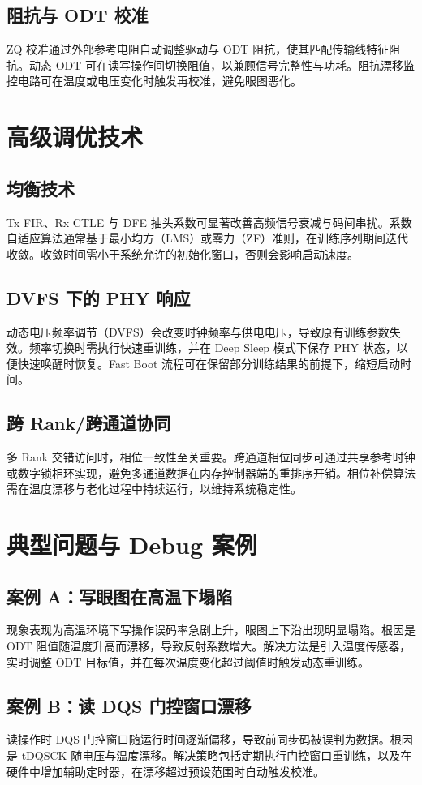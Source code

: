 \section{阻抗与 ODT 校准}
ZQ 校准通过外部参考电阻自动调整驱动与 ODT 阻抗，使其匹配传输线特征阻抗。动态 ODT 可在读写操作间切换阻值，以兼顾信号完整性与功耗。阻抗漂移监控电路可在温度或电压变化时触发再校准，避免眼图恶化。\par
\chapter{高级调优技术}
\section{均衡技术}
Tx FIR、Rx CTLE 与 DFE 抽头系数可显著改善高频信号衰减与码间串扰。系数自适应算法通常基于最小均方（LMS）或零力（ZF）准则，在训练序列期间迭代收敛。收敛时间需小于系统允许的初始化窗口，否则会影响启动速度。\par
\section{DVFS 下的 PHY 响应}
动态电压频率调节（DVFS）会改变时钟频率与供电电压，导致原有训练参数失效。频率切换时需执行快速重训练，并在 Deep Sleep 模式下保存 PHY 状态，以便快速唤醒时恢复。Fast Boot 流程可在保留部分训练结果的前提下，缩短启动时间。\par
\section{跨 Rank/跨通道协同}
多 Rank 交错访问时，相位一致性至关重要。跨通道相位同步可通过共享参考时钟或数字锁相环实现，避免多通道数据在内存控制器端的重排序开销。相位补偿算法需在温度漂移与老化过程中持续运行，以维持系统稳定性。\par
\chapter{典型问题与 Debug 案例}
\section{案例 A：写眼图在高温下塌陷}
现象表现为高温环境下写操作误码率急剧上升，眼图上下沿出现明显塌陷。根因是 ODT 阻值随温度升高而漂移，导致反射系数增大。解决方法是引入温度传感器，实时调整 ODT 目标值，并在每次温度变化超过阈值时触发动态重训练。\par
\section{案例 B：读 DQS 门控窗口漂移}
读操作时 DQS 门控窗口随运行时间逐渐偏移，导致前同步码被误判为数据。根因是 tDQSCK 随电压与温度漂移。解决策略包括定期执行门控窗口重训练，以及在硬件中增加辅助定时器，在漂移超过预设范围时自动触发校准。\par
